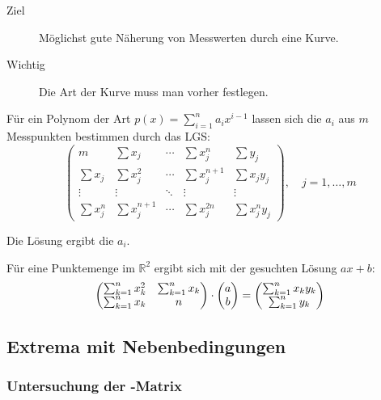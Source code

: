 \begin{description}
  \item [{Ziel}] Möglichst gute Näherung von Messwerten durch eine Kurve.
  \item [{Wichtig}] Die Art der Kurve muss man vorher festlegen.
\end{description}

Für ein Polynom der Art $p(x) = \sum_{i=1}^n a_i x^{i-1}$ lassen sich die $a_i$ aus $m$ Messpunkten bestimmen durch das LGS:
\[
  \left(
  \begin{array}{ccrc|c}
    m          & \sum x_j       & \cdots & \sum x_j^n     & \sum y_j       \\
    \sum x_j   & \sum x_j^2     & \cdots & \sum x_j^{n+1} & \sum x_j y_j   \\
    \vdots     & \vdots         & \ddots & \vdots         & \vdots         \\
    \sum x_j^n & \sum x_j^{n+1} & \cdots & \sum x_j^{2n}  & \sum x_j^n y_j
  \end{array}
  \right), \quad j=1,\ldots,m
\]

Die Lösung ergibt die $a_i$.

Für eine Punktemenge im $\mathbb{R}^{2}$ ergibt sich mit der gesuchten Lösung $ax+b$: 
\[
  \begin{pmatrix}
  	\sum_{k=1}^n x_k^2 & \sum_{k=1}^n x_k \\
  	\sum_{k=1}^n x_k   & n
  \end{pmatrix}
  \cdot \vecc(a;b) = \vecc( \sum_{k=1}^n x_k y_k; \sum_{k=1}^n y_k )
\]



\subsection{Extrema mit Nebenbedingungen}

\subsubsection{Untersuchung der \protect{}-Matrix}

